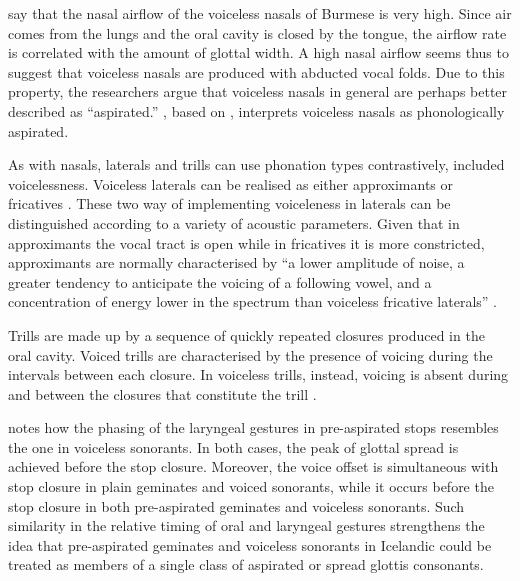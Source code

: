 \documentclass[11pt,a4paper,openany]{memoir}\usepackage[]{graphicx}\usepackage[]{color}
\begin{document}
\citet[111]{ladefoged1996} say that the nasal airflow of the voiceless nasals of Burmese is very high.
Since air comes from the lungs and the oral cavity is closed by the tongue, the airflow rate is correlated with the amount of glottal width.
A high nasal airflow seems thus to suggest that voiceless nasals are produced with abducted vocal folds.
Due to this property, the researchers argue that voiceless nasals in general are perhaps better described as ``aspirated.''
\citet[82]{kehrein2002}, based on \citet{ladefoged1996}, interprets voiceless nasals as phonologically aspirated.


As with nasals, laterals and trills can use phonation types contrastively, included voicelessness.
Voiceless laterals can be realised as either approximants or fricatives \citet{ladefoged1996}.
These two way of implementing voiceleness in laterals can be distinguished according to a variety of acoustic parameters.
Given that in approximants the vocal tract is open while in fricatives it is more constricted, approximants are normally characterised by ``a lower amplitude of noise, a greater tendency to anticipate the voicing of a following vowel, and a concentration of energy lower in the spectrum than voiceless fricative laterals'' \citep[198]{ladefoged1996}.

Trills are made up by a sequence of quickly repeated closures produced in the oral cavity.
Voiced trills are characterised by the presence of voicing during the intervals between each closure.
In voiceless trills, instead, voicing is absent during and between the closures that constitute the trill \citep[236]{ladefoged1996}.

\citet{helgason2002} notes how the phasing of the laryngeal gestures in pre-aspirated stops resembles the one in voiceless sonorants.
In both cases, the peak of glottal spread is achieved before the stop closure.
Moreover, the voice offset is simultaneous with stop closure in plain geminates and voiced sonorants, while it occurs before the stop closure in both pre-aspirated geminates and voiceless sonorants.
Such similarity in the relative timing of oral and laryngeal gestures strengthens the idea that pre-aspirated geminates and voiceless sonorants in Icelandic could be treated as members of a single class of aspirated or spread glottis consonants.
\end{document}
